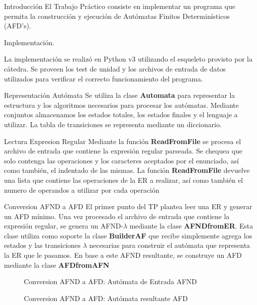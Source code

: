 \documentclass[a4paper,8pt]{article}
\newcommand{\ponerGrafico}[4]
{\begin{figure}[H]
	\centering
	\subfloat{\texttt{[image: \#1]}}
	\caption{#2} \label{fig:#4}
\end{figure}
}
\begin{document}
\pagestyle{myheadings}
\maketitle
\thispagestyle{empty}
\tableofcontents


\newpage

\begin{section}{Introducción}
El Trabajo Práctico consiste en implementar un programa que permita la construcción y ejecución de Autómatas Finitos Determinísticos (AFD's).

\end{section}

\begin{section}{Implementación.}

La implementación se realizó en Python v3 utilizando el esqueleto provisto por la cátedra. Se proveen los test de unidad y los archivos de entrada de datos utilizados para verificar el correcto funcionamiento del programa.

\end{section}
\begin{subsection}{Representación Autómata}
Se utiliza la clase \textbf{Automata} para representar la estructura y los algoritmos necesarios para procesar los autómatas.
Mediante conjuntos almacenamos los estados totales, los estados finales y el lenguaje a utilizar.
La tabla de transiciones se representa mediante un diccionario.

\end{subsection}

\begin{subsection}{Lectura Expresion Regular}
Mediante la función \textbf{ReadFromFile} se procesa el archivo de entrada que contiene la expresión regular parseada. Se chequea que solo contenga las operaciones y los caracteres aceptados por el enunciado, así como también, el indentado de las mismas. La función \textbf{ReadFromFile} devuelve una lista que contiene las operaciones de la ER a realizar, así como también el numero de operandos a utilizar por cada operación
\end{subsection}

\begin{subsection}{Conversion AFND a AFD}
El primer punto del TP plantea leer una ER y generar un AFD mínimo.
Una vez procesado el archivo de entrada que contiene la expresión regular, se genera un AFND-$\lambda$ mediante la clase \textbf{AFNDfromER}. Esta clase utiliza como soporte la clase \textbf{BuilderAF} que recibe simplemente agrega los estados y las transiciones $\lambda$ necesarias para construir el autómata que representa la ER que le pasamos.
En base a este AFND resultante, se construye un AFD  mediante la clase \textbf{AFDfromAFN}

\ponerGrafico{AFND_1.png}{Conversion AFND a AFD: Autómata de Entrada AFND}{0.4}{}
\ponerGrafico{AFND_2.png}{Conversion AFND a AFD: Autómata resultante AFD}{0.6}{}
\end{subsection}
\end{document}
